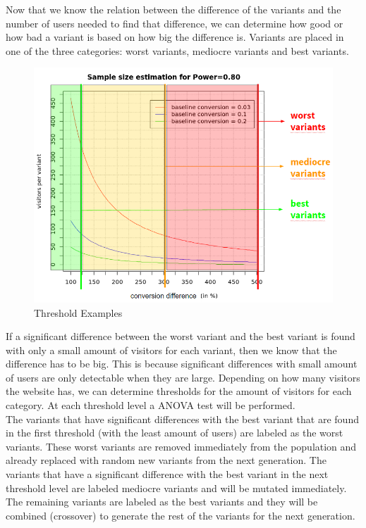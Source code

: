 \documentclass{report}
\begin{document}
Now that we know the relation between the difference of the variants and the number of users needed to find that difference, we can determine how good or how bad a variant is based on how big the difference is. Variants are placed in one of the three categories: worst variants, mediocre variants and best variants.\\

\begin{figure}[ht]
	\centering
	\includegraphics[width=\linewidth]{imgs/treshold_examples.PNG}
	\caption{Threshold Examples}
	\label{fig:te}
\end{figure}
\FloatBarrier
If a significant difference between the worst variant and the best variant is found with only a small amount of visitors for each variant, then we know that the difference has to be big. This is because significant differences with small amount of users are only detectable when they are large. Depending on how many visitors the website has, we can determine thresholds for the amount of visitors for each category. At each threshold level a ANOVA test will be performed.\\

The variants that have significant differences with the best variant that are found in the first threshold (with the least amount of users) are labeled as the worst variants. These worst variants are removed immediately from the population and already replaced with random new variants from the next generation. The variants that have a significant difference with the best variant in the next threshold level are labeled mediocre variants and will be mutated immediately. The remaining variants are labeled as the best variants and they will be combined (crossover) to generate the rest of the variants for the next generation.\\
\end{document}
